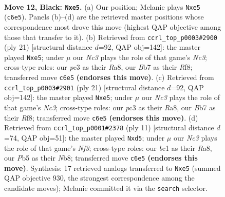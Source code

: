 \documentclass[11pt]{article}
\begin{document}
\clearpage

\begin{figure}[p]\centering
\begin{subfigure}{0.46\textwidth}\centering
\resizebox{\linewidth}{!}{%
\newchessgame
\chessboard[
  setfen={r2q2k1/1bp2rpp/pbnp1n2/1p2P3/4P3/1BP5/PP3PPP/RNBQR1K1 b - - 0 12},
  showmover=false,
  pgfstyle=straightmove, color=movearrow, markmove={c6-e5}
]}
\caption{}
\end{subfigure}\hfill
\begin{subfigure}{0.46\textwidth}\centering
\resizebox{\linewidth}{!}{%
\newchessgame
\chessboard[
  setfen={r2q1rk1/1pp2pbp/p1np1np1/4P1B1/2P1P3/2N2B1P/PP1Q1PP1/R3K2R b KQ - 0 11},
  showmover=false,
  pgfstyle=straightmove, color=movearrow, markmove={c6-e5}
]}
\caption{}
\end{subfigure}
\\[4pt]
\begin{subfigure}{0.46\textwidth}\centering
\resizebox{\linewidth}{!}{%
\newchessgame
\chessboard[
  setfen={r2q1rk1/1pp2pbp/p1np1np1/4P1B1/2P1P3/2N2B1P/PP1Q1PP1/R3K2R b KQ - 0 11},
  showmover=false,
  pgfstyle=straightmove, color=movearrow, markmove={c6-e5}
]}
\caption{}
\end{subfigure}\hfill
\begin{subfigure}{0.46\textwidth}\centering
\resizebox{\linewidth}{!}{%
\newchessgame
\chessboard[
  setfen={rnbq1rk1/ppp2ppp/4pn2/3P4/1b1P4/2NBP3/PP3PPP/R1BQK1NR b KQ - 0 6},
  showmover=false,
  pgfstyle=straightmove, color=movearrow, markmove={f6-d5}
]}
\caption{}
\end{subfigure}
\caption{\textbf{Move 12, Black: \texttt{Nxe5}.} (a) Our position; Melanie plays \texttt{Nxe5} (\texttt{c6e5}). Panels (b)--(d) are the retrieved master positions whose correspondence most drove this move (highest QAP objective among those that transfer to it). (b) Retrieved from \texttt{ccrl\_top\_p0003\#2900} (ply 21) [structural distance $d$=92, QAP obj=142]: the master played \texttt{Nxe5}; under $\mu$ our \emph{Nc3} plays the role of that game's \emph{Nc3}; cross-type roles: our \emph{p}c3 as their \emph{R}a8, our \emph{B}b7 as their \emph{R}f8; transferred move \texttt{c6e5} \textbf{(endorses this move)}. (c) Retrieved from \texttt{ccrl\_top\_p0003\#2901} (ply 21) [structural distance $d$=92, QAP obj=142]: the master played \texttt{Nxe5}; under $\mu$ our \emph{Nc3} plays the role of that game's \emph{Nc3}; cross-type roles: our \emph{p}c3 as their \emph{R}a8, our \emph{B}b7 as their \emph{R}f8; transferred move \texttt{c6e5} \textbf{(endorses this move)}. (d) Retrieved from \texttt{ccrl\_top\_p0001\#2378} (ply 11) [structural distance $d$=74, QAP obj=51]: the master played \texttt{Nxd5}; under $\mu$ our \emph{Nc3} plays the role of that game's \emph{Nf3}; cross-type roles: our \emph{b}c1 as their \emph{R}a8, our \emph{P}b5 as their \emph{N}b8; transferred move \texttt{c6e5} \textbf{(endorses this move)}. Synthesis: 17 retrieved analogs transferred to \texttt{Nxe5} (summed QAP objective 930, the strongest correspondence among the candidate moves); Melanie committed it via the \texttt{search} selector.}
\label{fig:thought-m23}
\end{figure}
\end{document}
